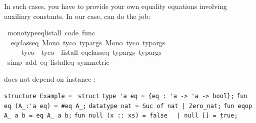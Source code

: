 \begin{isabellebody}
\begin{isamarkuptext}
  In such cases, you have to provide your own equality equations
  involving auxiliary constants.  In our case,
   can do the job:%
\end{isamarkuptext}%
\isamarkuptrue%
%
\isadelimquoteme
%
\endisadelimquoteme
%
\isatagquoteme
{}\isamarkupfalse%
\ monotype{\isacharunderscore}eq{\isacharunderscore}list{\isacharunderscore}all{}\ {\isacharbrackleft}code\ func{\isacharbrackright}{\isacharcolon}\isanewline
\ \ {\isachardoublequoteopen}eq{\isacharunderscore}class{\isachardot}eq\ {\isacharparenleft}Mono\ tyco{}\ typargs{}{\isacharparenright}\ {\isacharparenleft}Mono\ tyco{}\ typargs{}{\isacharparenright}\ {\isasymlongleftrightarrow}\isanewline
\ \ \ \ \ tyco{}\ {\isacharequal}\ tyco{}\ {\isasymand}\ list{\isacharunderscore}all{}\ eq{\isacharunderscore}class{\isachardot}eq\ typargs{}\ typargs{}{\isachardoublequoteclose}\isanewline
\ \ \isamarkupfalse%
\ {\isacharparenleft}simp\ add{\isacharcolon}\ eq\ list{\isacharunderscore}all{}{\isacharunderscore}eq\ {\isacharbrackleft}symmetric{\isacharbrackright}{\isacharparenright}%
\endisatagquoteme
{\isafoldquoteme}%
%
\isadelimquoteme
%
\endisadelimquoteme
%
\begin{isamarkuptext}%
\noindent does not depend on instance :%
\end{isamarkuptext}%
\isamarkuptrue%
%
\isadelimquoteme
%
\endisadelimquoteme
%
\isatagquoteme
%
\begin{isamarkuptext}%
\isaverbatim%
\noindent%
\verb|structure Example = |\newline%
\verb|struct|\newline%
\newline%
\verb|type 'a eq = {eq : 'a -> 'a -> bool};|\newline%
\verb|fun eq (A_:'a eq) = #eq A_;|\newline%
\newline%
\verb|datatype nat = Suc of nat |\verb,|,\verb| Zero_nat;|\newline%
\newline%
\verb|fun eqop A_ a b = eq A_ a b;|\newline%
\newline%
\verb|fun null (x :: xs) = false|\newline%
\verb|  |\verb,|,\verb| null [] = true;|\newline%

\end{isamarkuptext}
\end{isabellebody}
